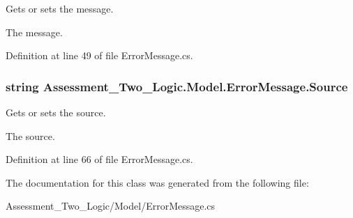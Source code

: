Gets or sets the message. 

The message.

Definition at line 49 of file ErrorMessage.cs.

\hypertarget{class_assessment___two___logic_1_1_model_1_1_error_message_a747bdfe2fe83d3d078f140d19255f65f}{
\subsubsection[{Source}]{\setlength{\rightskip}{0pt plus 5cm}string Assessment\_\-Two\_\-Logic.Model.ErrorMessage.Source}}
\label{class_assessment___two___logic_1_1_model_1_1_error_message_a747bdfe2fe83d3d078f140d19255f65f}


Gets or sets the source. 

The source.

Definition at line 66 of file ErrorMessage.cs.



The documentation for this class was generated from the following file:\begin{DoxyCompactItemize}
\item 
Assessment\_\-Two\_\-Logic/Model/ErrorMessage.cs\end{DoxyCompactItemize}
